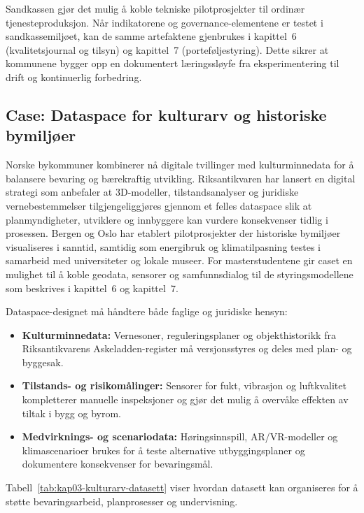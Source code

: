 Sandkassen gjør det mulig å koble tekniske pilotprosjekter til ordinær tjenesteproduksjon. Når indikatorene og governance-elementene er testet i sandkassemiljøet, kan de samme artefaktene gjenbrukes i kapittel~6 (kvalitetsjournal og tilsyn) og kapittel~7 (porteføljestyring). Dette sikrer at kommunene bygger opp en dokumentert læringssløyfe fra eksperimentering til drift og kontinuerlig forbedring.

\subsection{Case: Dataspace for kulturarv og historiske bymiljøer}
Norske bykommuner kombinerer nå digitale tvillinger med kulturminnedata for å balansere bevaring og bærekraftig utvikling. Riksantikvaren har lansert en digital strategi som anbefaler at 3D-modeller, tilstandsanalyser og juridiske vernebestemmelser tilgjengeliggjøres gjennom et felles dataspace slik at planmyndigheter, utviklere og innbyggere kan vurdere konsekvenser tidlig i prosessen.\citep{riksantikvaren2023digitalarv} Bergen og Oslo har etablert pilotprosjekter der historiske bymiljøer visualiseres i sanntid, samtidig som energibruk og klimatilpasning testes i samarbeid med universiteter og lokale museer.\citep{bergen2024kulturminne,oslo2024bymiljolab} For masterstudentene gir caset en mulighet til å koble geodata, sensorer og samfunnsdialog til de styringsmodellene som beskrives i kapittel~6 og kapittel~7.

Dataspace-designet må håndtere både faglige og juridiske hensyn:
\begin{itemize}
    \item \textbf{Kulturminnedata:} Vernesoner, reguleringsplaner og objekthistorikk fra Riksantikvarens Askeladden-register må versjonsstyres og deles med plan- og byggesak.
    \item \textbf{Tilstands- og risikomålinger:} Sensorer for fukt, vibrasjon og luftkvalitet kompletterer manuelle inspeksjoner og gjør det mulig å overvåke effekten av tiltak i bygg og byrom.
    \item \textbf{Medvirknings- og scenariodata:} Høringsinnspill, AR/VR-modeller og klimascenarioer brukes for å teste alternative utbyggingsplaner og dokumentere konsekvenser for bevaringsmål.
\end{itemize}

Tabell~\ref{tab:kap03-kulturarv-datasett} viser hvordan datasett kan organiseres for å støtte bevaringsarbeid, planprosesser og undervisning.

